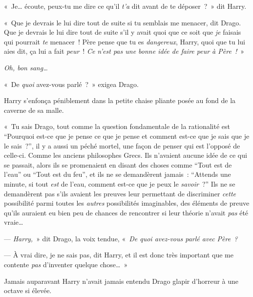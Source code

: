«~Je… écoute, peux-tu me dire ce qu'il \emph{t'a} dit avant de te déposer~?~»
dit Harry.

«~Que je devrais le lui dire tout de suite si tu semblais me menacer, dit Drago.
Que je devrais le lui dire tout de suite s'il y avait quoi que ce soit que \emph{je} faisais qui pourrait \emph{te} menacer~!
Père pense que tu es \emph{dangereux}, Harry, quoi que tu lui aies dit, ça lui a fait \emph{peur}~!
\emph{Ce n'est pas une bonne idée de faire peur à Père~!}~»

\emph{Oh, bon sang…}

«~De \emph{quoi} avez-vous parlé~?~»
exigea Drago.

Harry s'enfonça péniblement dans la petite chaise pliante posée au fond de la caverne de sa malle.

«~Tu sais Drago, tout comme la question fondamentale de la rationalité est “Pourquoi est-ce que je pense ce que je pense et comment est-ce que je sais que je le sais~?”, il y a aussi un péché mortel, une façon de penser qui est l'opposé de celle-ci.
Comme les anciens philosophes Grecs.
Ils n'avaient aucune idée de ce qui se passait, alors ils se promenaient en disant des choses comme “Tout est de l'eau” ou “Tout est du feu”, et ils ne se demandèrent jamais~: “Attends une minute, si tout \emph{est} de l'eau, comment est-ce que je peux le \emph{savoir}~?” Ils ne se demandèrent pas s'ils avaient les preuves leur permettant de discriminer \emph{cette} possibilité parmi toutes les \emph{autres} possibilités imaginables, des éléments de preuve qu'ils auraient eu bien peu de chances de rencontrer si leur théorie n'avait \emph{pas} été vraie…

--- \emph{Harry,}~» dit Drago, la voix tendue, «~\emph{De quoi avez-vous parlé avec Père~?}

--- À vrai dire, je ne sais pas, dit Harry, et il est donc très important que me contente \emph{pas} d'inventer quelque chose…~»

Jamais auparavant Harry n'avait jamais entendu Drago glapir d'horreur à une octave si élevée.
